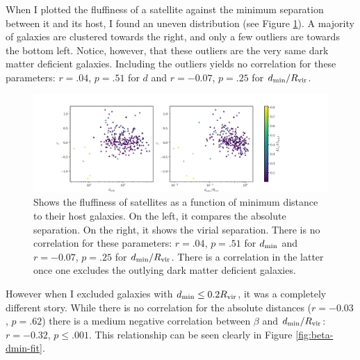 When I plotted the fluffiness of a satellite against the minimum separation between it and its host, I found an uneven distribution (see Figure \ref{fig:beta-dmin}). A majority of galaxies are clustered towards the right, and only a few outliers are towards the bottom left. Notice, however, that these outliers are the very same dark matter deficient galaxies. Including the outliers yields no correlation for these parameters: $r = .04$, $p=.51$ for $d$ and $r = -0.07$, $p = .25$ for $d_{\rm{min}} / R_{\rm{vir}}$.
\begin{figure}
    \centering
    \includegraphics*[width=\textwidth*11/10]{figs/me/beta-dmin.pdf}
    \caption{Shows the fluffiness of satellites as a function of minimum distance to their host galaxies. On the left, it compares the absolute separation. On the right, it shows the virial separation. There is no correlation for these parameters: $r = .04$, $p=.51$ for $d_{\rm{min}}$ and $r = -0.07$, $p = .25$ for $d_{\rm{min}} / R_{\rm{vir}}$. There is a correlation in the latter once one excludes the outlying dark matter deficient galaxies.}
    \label{fig:beta-dmin}
\end{figure}

However when I excluded galaxies with $d_{\rm{min}} \leq 0.2 R_{\rm{vir}}$, it was a completely different story. While there is no correlation for the absolute distances ($r = -0.03$, $p = .62$) there is a medium negative correlation between $\beta$ and $d_{\rm{min}}/R_{\rm{vir}}$: $r=-0.32$, $p \leq .001$. This relationship can be seen clearly in Figure \ref{fig:beta-dmin-fit}.

